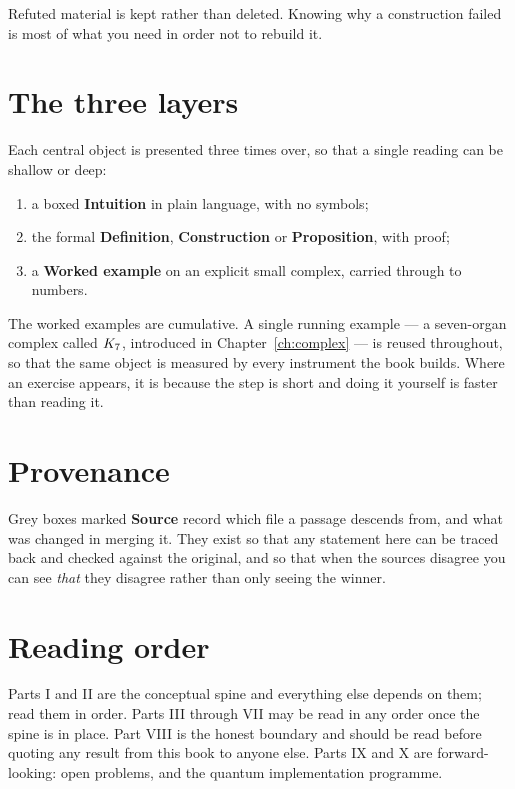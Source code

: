 Refuted material is kept rather than deleted. Knowing why a construction
failed is most of what you need in order not to rebuild it.

\section*{The three layers}

Each central object is presented three times over, so that a single
reading can be shallow or deep:

\begin{enumerate}
  \item a boxed \textbf{Intuition} in plain language, with no symbols;
  \item the formal \textbf{Definition}, \textbf{Construction} or
        \textbf{Proposition}, with proof;
  \item a \textbf{Worked example} on an explicit small complex, carried
        through to numbers.
\end{enumerate}

The worked examples are cumulative. A single running example --- a
seven-organ complex called $K_7$, introduced in
Chapter~\ref{ch:complex} --- is reused throughout, so that the same
object is measured by every instrument the book builds. Where an
exercise appears, it is because the step is short and doing it yourself
is faster than reading it.

\section*{Provenance}

Grey boxes marked \textsf{\textbf{Source}} record which file a passage
descends from, and what was changed in merging it. They exist so that
any statement here can be traced back and checked against the original,
and so that when the sources disagree you can see \emph{that} they
disagree rather than only seeing the winner.

\section*{Reading order}

Parts I and II are the conceptual spine and everything else depends on
them; read them in order. Parts III through VII may be read in any
order once the spine is in place. Part VIII is the honest boundary and
should be read before quoting any result from this book to anyone else.
Parts IX and X are forward-looking: open problems, and the quantum
implementation programme.
